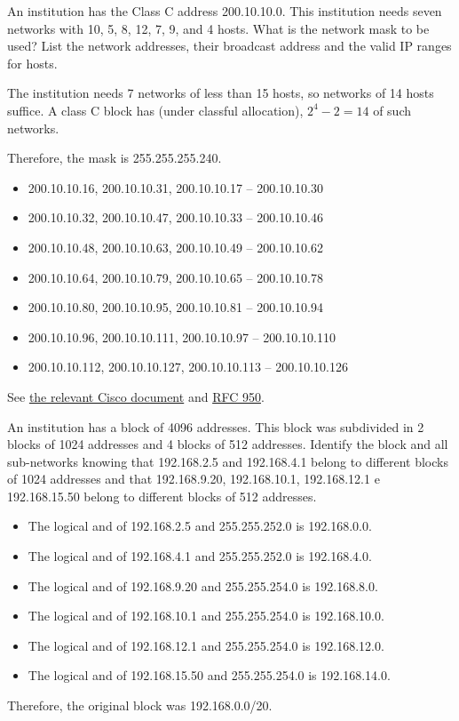 \begin{Exercise}
An institution has the Class C address 200.10.10.0.
This institution needs seven networks with 10, 5, 8, 12, 7, 9, and 4 hosts.
What is the network mask to be used?
List the network addresses, their broadcast address and the valid IP ranges for hosts.
\end{Exercise}
\begin{Answer}
The institution needs 7 networks of less than 15 hosts, so networks of 14 hosts suffice. A class C block has (under classful allocation), \(2^{4} - 2 = 14\) of such networks.

Therefore, the mask is 255.255.255.240.

\begin{itemize}
\item 200.10.10.16, 200.10.10.31, 200.10.10.17 -- 200.10.10.30
\item 200.10.10.32, 200.10.10.47, 200.10.10.33 -- 200.10.10.46
\item 200.10.10.48, 200.10.10.63, 200.10.10.49 -- 200.10.10.62
\item 200.10.10.64, 200.10.10.79, 200.10.10.65 -- 200.10.10.78
\item 200.10.10.80, 200.10.10.95, 200.10.10.81 -- 200.10.10.94
\item 200.10.10.96, 200.10.10.111, 200.10.10.97 -- 200.10.10.110
\item 200.10.10.112, 200.10.10.127, 200.10.10.113 -- 200.10.10.126
\end{itemize}

See \href{https://www.cisco.com/c/en/us/support/docs/ip/dynamic-address-allocation-resolution/13711-40.html}{the relevant Cisco document} and \href{https://tools.ietf.org/html/rfc950}{RFC 950}.
\end{Answer}

\begin{Exercise}
An institution has a block of 4096 addresses.
This block was subdivided in 2 blocks of 1024 addresses and 4 blocks of 512 addresses.
Identify the block and all sub-networks knowing that 192.168.2.5 and 192.168.4.1 belong to different blocks of 1024 addresses and that 192.168.9.20, 192.168.10.1, 192.168.12.1 e 192.168.15.50 belong to different blocks of 512 addresses.
\end{Exercise}
\begin{Answer}
\begin{itemize}
\item The logical and of 192.168.2.5 and 255.255.252.0 is 192.168.0.0.
\item The logical and of 192.168.4.1 and 255.255.252.0 is 192.168.4.0.
\item The logical and of 192.168.9.20 and 255.255.254.0 is 192.168.8.0.
\item The logical and of 192.168.10.1 and 255.255.254.0 is 192.168.10.0.
\item The logical and of 192.168.12.1 and 255.255.254.0 is 192.168.12.0.
\item The logical and of 192.168.15.50 and 255.255.254.0 is 192.168.14.0.
\end{itemize}
Therefore, the original block was 192.168.0.0/20.
\end{Answer}

